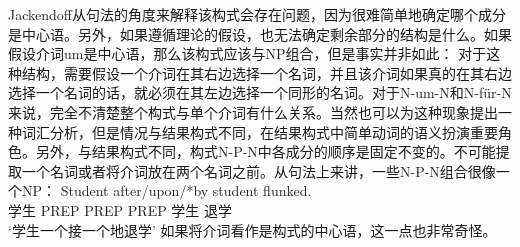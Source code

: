 \begin{exe}
\begin{xlist}[iv.]
\begin{exe}
\begin{xlist}[iv.]
Jackendoff从句法的角度来解释该构式会存在问题，因为很难简单地确定哪个成分是中心语。另外，如果遵循\xbarc 理论的假设，也无法确定剩余部分的结构是什么。如果假设介词um是中心语，那么该构式应该与NP组合，但是事实并非如此：
\eal
{} 
\zl
对于这种结构，需要假设一个介词在其右边选择一个名词，并且该介词如果真的在其右边选择一个名词的话，就必须在其左边选择一个同形的名词。对于N-um-N和N-für-N来说，完全不清楚整个构式与单个介词有什么关系。当然也可以为这种现象提出一种词汇分析，但是情况与结果构式不同，在结果构式中简单动词的语义扮演重要角色。另外，与结果构式不同，构式N-P-N中各成分的顺序是固定不变的。不可能提取一个名词或者将介词放在两个名词之前。从句法上来讲，一些N-P-N组合很像一个NP\citep[]{Jackendoff2008a}：
\ea
\gll Student after/upon/*by student flunked.\\
	 学生 PREP PREP PREP 学生 退学\\
\glt `学生一个接一个地退学'
\z
如果将介词看作是构式的中心语，这一点也非常奇怪。


\end{xlist}
\end{exe}
\end{xlist}
\end{exe}
